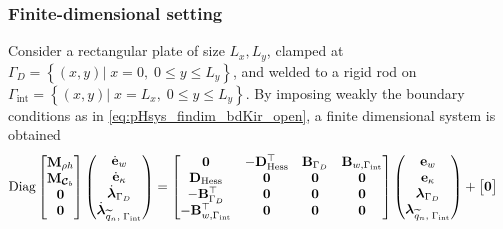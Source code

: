 \subsubsection{Finite-dimensional setting}
Consider a rectangular plate of size $L_x, L_y$, clamped at $\Gamma_{D} = \left\{(x,y) \vert \;  x=0, \; 0 \le y \le L_y  \right\}$, and welded to a rigid rod on $\Gamma_{\text{int}} = \left\{ (x,y) \vert \;  x=L_x, \; 0 \le y \le L_y  \right\}$. By imposing weakly the boundary conditions as in \eqref{eq:pHsys_findim_bdKir_open}, a finite dimensional system is obtained
\begin{equation}\label{eq:pHsys_findim_intKir_open}
\begin{aligned}
\mathrm{Diag}
\begin{bmatrix}
\mathbf{M}_{\rho h}\\
\mathbf{M}_{\bm{\mathcal{C}}_b}\\
\mathbf{0}\\
\mathbf{0}\\
\end{bmatrix}
\begin{pmatrix}
\dot{\mathbf{e}}_{w} \\
\dot{\mathbf{e}}_{\kappa} \\
\dot{\bm{\lambda}}_{\Gamma_D} \\
\dot{\bm{\lambda}}_{\widetilde{q}_n, \; \Gamma_{\mathrm{int}}} \\
\end{pmatrix}
&= \begin{bmatrix}
\mathbf{0} & - \mathbf{D}_{\operatorname*{Hess}}^\top & \mathbf{B}_{\Gamma_D} & \mathbf{B}_{w, \Gamma_{\mathrm{int}}}\\
\mathbf{D}_{\operatorname*{Hess}} & \mathbf{0} & \mathbf{0} & \mathbf{0} \\
-\mathbf{B}_{\Gamma_D}^\top & \mathbf{0} & \mathbf{0} & \mathbf{0} \\
-\mathbf{B}_{w, \Gamma_{\mathrm{int}}}^\top & \mathbf{0} & \mathbf{0} & \mathbf{0} \\
\end{bmatrix} 
\begin{pmatrix}
{\mathbf{e}}_{w} \\
{\mathbf{e}}_{\kappa} \\
{\bm{\lambda}}_{\Gamma_D} \\
{\bm{\lambda}}_{\widetilde{q}_n, \; \Gamma_{\mathrm{int}}} \\
\end{pmatrix} + 
\begin{bmatrix}
\mathbf{0} \\

\end{bmatrix}
\end{aligned}
\end{equation}
